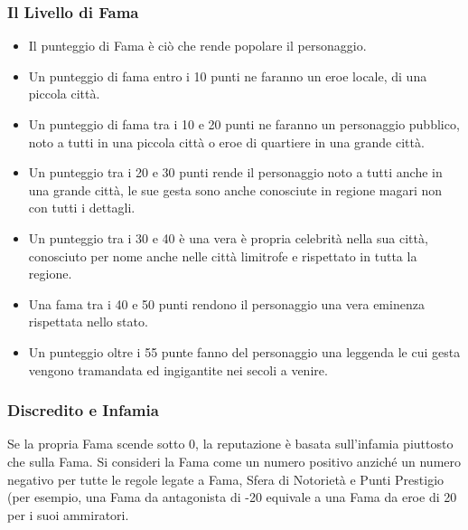 \documentclass[a4paper,twoside,openany]{book}
\begin{document}
\begin{multicols}{2}

\subsubsection{Il Livello di Fama}

\begin{itemize}[leftmargin=*]


\item Il punteggio di Fama è ciò che rende popolare il personaggio.

\item Un punteggio di fama entro i 10 punti ne faranno un eroe locale, di una piccola città.

\item Un punteggio di fama tra i 10 e 20 punti ne faranno un personaggio pubblico, noto a tutti in una piccola città o eroe di quartiere in una grande città.

\item Un punteggio tra i 20 e 30 punti rende il personaggio noto a tutti anche in una grande città, le sue gesta sono anche conosciute in regione magari non con tutti i dettagli.

\item Un punteggio tra i 30 e 40 è una vera è propria celebrità nella sua città, conosciuto per nome anche nelle città limitrofe e rispettato in tutta la regione.

\item Una fama tra i 40 e 50 punti rendono il personaggio una vera eminenza rispettata nello stato.

\item Un punteggio oltre i 55 punte fanno del personaggio una leggenda le cui gesta vengono tramandata ed ingigantite nei secoli a venire.

\end{itemize}

\subsubsection{Discredito e Infamia}


Se la propria Fama scende sotto 0, la reputazione è basata sull'infamia piuttosto che sulla Fama. Si consideri la Fama come un numero positivo anziché un numero negativo per tutte le regole legate a Fama, Sfera di Notorietà e Punti Prestigio (per esempio, una Fama da antagonista di -20 equivale a una Fama da eroe di 20 per i suoi ammiratori.



\end{multicols}
\end{document}
